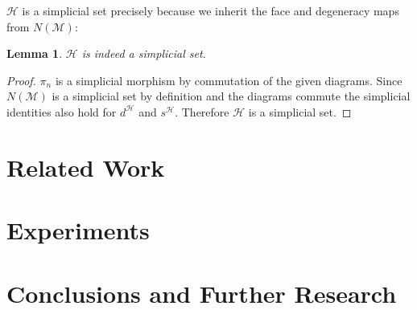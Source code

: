 \documentclass[12pt]{article}
\newtheorem{lemma}{Lemma}[section]
\newcommand{\1}{\mathbbm{1}}
\newcommand{\M}{\mathcal{M}}
\renewcommand{\H}{\mathcal{H}}
\begin{document}
$\H$ is a simplicial set precisely because we inherit the face and degeneracy maps from $N(\M)$:\\

\begin{lemma}
    $\H$ is indeed a simplicial set.
\end{lemma}

\begin{proof}
    $\pi_n$ is a simplicial morphism by commutation of the given diagrams. Since $N(\M)$ is a simplicial set by definition and the diagrams commute the simplicial identities also hold for $d^{\H}$ and $s^{\H}$. Therefore $\H$ is a simplicial set.
\end{proof}

\newpage
\section{Related Work}\label{relatedwork}

\section{Experiments}\label{experiments}

\section{Conclusions and Further Research}\label{conclusions}





\end{document}
